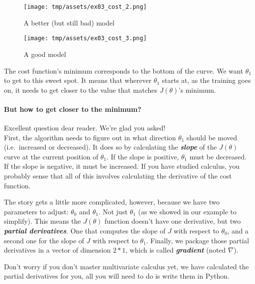 \documentclass[]{article}
\let\oldparagraph\paragraph
\renewcommand{\paragraph}[1]{\oldparagraph{#1}\mbox{}}
\begin{document}
\begin{figure}
\centering
\texttt{[image: tmp/assets/ex03\_cost\_2.png]}
\caption{A better (but still bad) model}
\end{figure}

\begin{figure}
\centering
\texttt{[image: tmp/assets/ex03\_cost\_3.png]}
\caption{A good model}
\end{figure}

The cost function's minimum corresponds to the bottom of the curve. We
want \(\theta_1\) to get to this sweet spot. It means that wherever
\(\theta_1\) starts at, as the training goes on, it needs to get closer
to the value that matches \(J(\theta)\)'s minimum.

\hypertarget{but-how-to-get-closer-to-the-minimum}{%
\paragraph{But how to get closer to the
minimum?}\label{but-how-to-get-closer-to-the-minimum}}

Excellent question dear reader. We're glad you asked!\\
First, the algorithm needs to figure out in what direction \(\theta_1\)
should be moved (i.e.~increased or decreased). It does so by calculating
the \textbf{\emph{slope}} of the \(J(\theta)\) curve at the current
position of \(\theta_1\). If the slope is positive, \(\theta_1\) must be
decreased. If the slope is negative, it must be increased. If you have
studied calculus, you probably sense that all of this involves
calculating the derivative of the cost function.

The story gets a little more complicated, however, because we have two
parameters to adjust: \(\theta_0\) and \(\theta_1\). Not just
\(\theta_1\) (as we showed in our example to simplify). This means the
\(J(\theta)\) function doesn't have one derivative, but two
\textbf{\emph{partial derivatives}}. One that computes the slope of
\(J\) with respect to \(\theta_0\), and a second one for the slope of
\(J\) with respect to \(\theta_1\). Finally, we package those partial
derivatives in a vector of dimension \(2 * 1\), which is called
\textbf{\emph{gradient}} (noted \(\nabla\)).

Don't worry if you don't master multivariate calculus yet, we have
calculated the partial derivatives for you, all you will need to do is
write them in Python.\\
\clearpage
\end{document}
